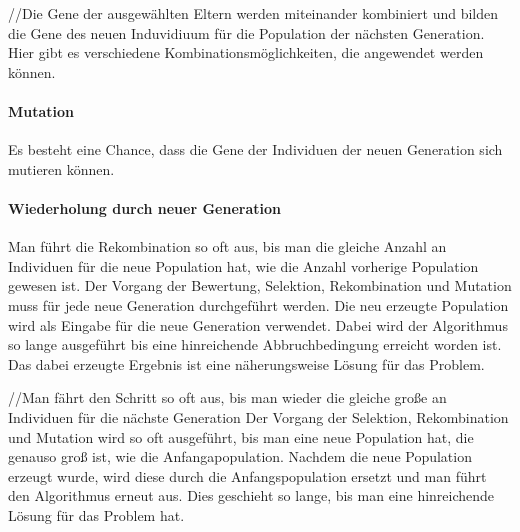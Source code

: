 //Die Gene der ausgew{\"a}hlten Eltern werden miteinander kombiniert und bilden die Gene des neuen Induvidiuum f{\"u}r die Population der n{\"a}chsten Generation. Hier gibt es verschiedene Kombinationsm{\"o}glichkeiten, die angewendet werden k{\"o}nnen.

\paragraph*{Mutation}
Es besteht eine Chance, dass die Gene der Individuen der neuen Generation sich mutieren k{\"o}nnen. 

\paragraph*{Wiederholung durch neuer Generation}

Man f{\"u}hrt die Rekombination so oft aus, bis man die gleiche Anzahl an Individuen f{\"u}r die neue Population hat, wie die Anzahl vorherige Population gewesen ist. 
Der Vorgang der Bewertung, Selektion, Rekombination und Mutation muss f{\"u}r jede neue Generation durchgef{\"u}hrt werden. 
Die neu erzeugte Population wird als Eingabe f{\"u}r die neue Generation verwendet. 
Dabei wird der Algorithmus so lange ausgef{\"u}hrt bis eine hinreichende Abbruchbedingung erreicht worden ist. 
Das dabei erzeugte Ergebnis ist eine n{\"a}herungsweise L{\"o}sung f{\"u}r das Problem.

//Man f{\"a}hrt den Schritt so oft aus, bis man wieder die gleiche gro{\ss}e an Individuen f{\"u}r die n{\"a}chste Generation 
Der Vorgang der Selektion, Rekombination und Mutation wird so oft ausgef{\"u}hrt, bis man eine neue Population hat, die genauso gro{\ss} ist, wie die Anfangapopulation.
Nachdem die neue Population erzeugt wurde, wird diese durch die Anfangspopulation ersetzt und man f{\"u}hrt den Algorithmus erneut aus. 
Dies geschieht so lange, bis man eine hinreichende L{\"o}sung f{\"u}r das Problem hat. 
